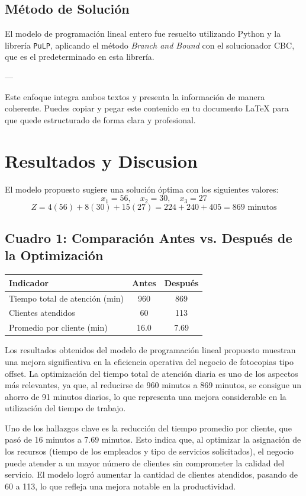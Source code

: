\documentclass[12pt]{article}
\begin{document}
\subsection{Método de Solución}

El modelo de programación lineal entero fue resuelto utilizando Python y la librería \texttt{PuLP}, aplicando el método \textit{Branch and Bound} con el solucionador CBC, que es el predeterminado en esta librería.

---

Este enfoque integra ambos textos y presenta la información de manera coherente. Puedes copiar y pegar este contenido en tu documento LaTeX para que quede estructurado de forma clara y profesional.


\section{Resultados y Discusion}
El modelo propuesto sugiere una solución óptima con los siguientes valores:
\[
x_1 = 56, \quad x_2 = 30, \quad x_3 = 27
\]
\[
Z = 4(56) + 8(30) + 15(27) = 224 + 240 + 405 = 869 \text{ minutos}
\]

\subsection*{Cuadro 1: Comparación Antes vs. Después de la Optimización}

\begin{center}
\begin{tabular}{lcc}
\toprule
\textbf{Indicador} & \textbf{Antes} & \textbf{Después} \\
\midrule
Tiempo total de atención (min) & 960 & 869 \\
Clientes atendidos & 60 & 113 \\
Promedio por cliente (min) & 16.0 & 7.69 \\
\bottomrule
\end{tabular}
\end{center}
Los resultados obtenidos del modelo de programación lineal propuesto muestran una mejora significativa en la eficiencia operativa del negocio de fotocopias tipo offset. La optimización del tiempo total de atención diaria es uno de los aspectos más relevantes, ya que, al reducirse de 960 minutos a 869 minutos, se consigue un ahorro de 91 minutos diarios, lo que representa una mejora considerable en la utilización del tiempo de trabajo.

Uno de los hallazgos clave es la reducción del tiempo promedio por cliente, que pasó de 16 minutos a 7.69 minutos. Esto indica que, al optimizar la asignación de los recursos (tiempo de los empleados y tipo de servicios solicitados), el negocio puede atender a un mayor número de clientes sin comprometer la calidad del servicio. El modelo logró aumentar la cantidad de clientes atendidos, pasando de 60 a 113, lo que refleja una mejora notable en la productividad.
\end{document}

